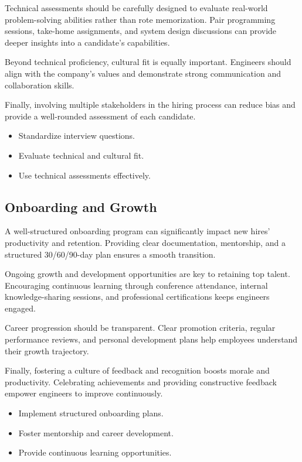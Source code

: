 Technical assessments should be carefully designed to evaluate real-world problem-solving abilities rather than rote memorization. Pair programming sessions, take-home assignments, and system design discussions can provide deeper insights into a candidate's capabilities.

Beyond technical proficiency, cultural fit is equally important. Engineers should align with the company's values and demonstrate strong communication and collaboration skills.

Finally, involving multiple stakeholders in the hiring process can reduce bias and provide a well-rounded assessment of each candidate.

\begin{itemize}
    \item Standardize interview questions.
    \item Evaluate technical and cultural fit.
    \item Use technical assessments effectively.
\end{itemize}

\subsection{Onboarding and Growth}
A well-structured onboarding program can significantly impact new hires' productivity and retention. Providing clear documentation, mentorship, and a structured 30/60/90-day plan ensures a smooth transition.

Ongoing growth and development opportunities are key to retaining top talent. Encouraging continuous learning through conference attendance, internal knowledge-sharing sessions, and professional certifications keeps engineers engaged.

Career progression should be transparent. Clear promotion criteria, regular performance reviews, and personal development plans help employees understand their growth trajectory.

Finally, fostering a culture of feedback and recognition boosts morale and productivity. Celebrating achievements and providing constructive feedback empower engineers to improve continuously.

\begin{itemize}
    \item Implement structured onboarding plans.
    \item Foster mentorship and career development.
    \item Provide continuous learning opportunities.
\end{itemize}

